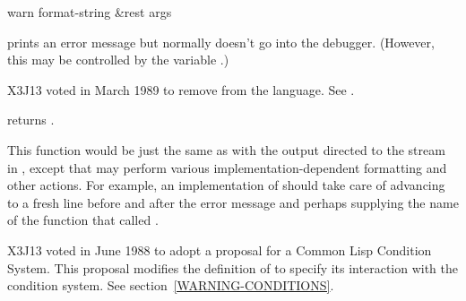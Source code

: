 \begin{defun}[Function]
warn format-string &rest args

\begin{obsolete}
\noindent
{} prints an error message but normally
doesn't go into the debugger.  (However, this may be controlled
by the variable .)
\end{obsolete}
\begin{newer}
X3J13 voted in March 1989
to remove  from the language.
See .
\end{newer}
\begin{obsolete}
 returns {\false}.

This function would be just the same as
 with the output directed 
to the stream in , except that 
may perform various implementation-dependent formatting and
other actions.  For example, an implementation of  should take
care of advancing to a fresh line before and after the error message
and perhaps supplying the name of the function that called .
\end{obsolete}

\begin{new}
X3J13 voted in June 1988
to adopt a proposal for a Common Lisp Condition System. 
This proposal modifies the definition of  to specify its interaction
with the condition system.  See section~\ref{WARNING-CONDITIONS}.
\end{new}
\end{defun}

